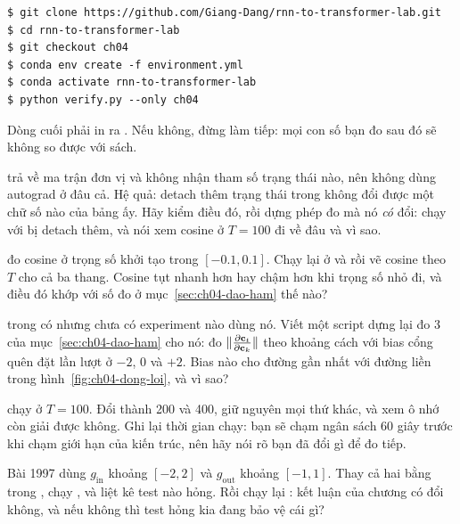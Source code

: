 \begin{verbatim}
$ git clone https://github.com/Giang-Dang/rnn-to-transformer-lab.git
$ cd rnn-to-transformer-lab
$ git checkout ch04
$ conda env create -f environment.yml
$ conda activate rnn-to-transformer-lab
$ python verify.py --only ch04
\end{verbatim}

Dòng cuối phải in ra . Nếu không, đừng làm tiếp: mọi con số
bạn đo sau đó sẽ không so được với sách.

\begin{bt}
  \item {} trả về ma trận đơn vị và không nhận
    tham số trạng thái nào, nên  không dùng autograd ở đâu
    cả. Hệ quả: detach thêm trạng thái  trong
     không đổi được một chữ số nào của bảng ấy. Hãy kiểm điều đó,
    rồi dựng phép đo mà nó \emph{có} đổi: chạy
     với  bị detach thêm, và nói
    xem cosine ở \(T = 100\) đi về đâu và vì sao.

  \item {} đo cosine ở trọng số khởi tạo
    trong \([-0.1, 0.1]\). Chạy lại ở  và 
    rồi vẽ cosine theo \(T\) cho cả ba thang. Cosine tụt nhanh hơn hay chậm hơn
    khi trọng số nhỏ đi, và điều đó khớp với số đo ở
    mục~\ref{sec:ch04-dao-ham} thế nào?

  \item {} trong  có 
    nhưng chưa có
    experiment nào dùng nó. Viết một script dựng lại đo 3 của
    mục~\ref{sec:ch04-dao-ham} cho nó: đo
    \(\lVert \frac{\partial \mathbf{c}_t}{\partial \mathbf{c}_k} \rVert\) theo khoảng cách với bias cổng quên
    đặt lần lượt ở \(-2\), \(0\) và \(+2\). Bias nào cho đường gần nhất với
    đường liền trong hình~\ref{fig:ch04-dong-loi}, và vì sao?

  \item {} chạy ở \(T = 100\). Đổi
     thành 200 và 400, giữ nguyên mọi thứ khác, và xem ô nhớ còn
    giải được không. Ghi lại thời gian chạy: bạn sẽ chạm ngân sách 60 giây
    trước khi chạm giới hạn của kiến trúc, nên hãy nói rõ bạn đã đổi gì để đo
    tiếp.

  \item Bài 1997 dùng \(g_{\mathrm{in}}\) khoảng \([-2,2]\) và
    \(g_{\mathrm{out}}\) khoảng \([-1,1]\). Thay cả hai bằng 
    trong , chạy ,
    và liệt kê test nào hỏng. Rồi chạy lại : kết luận của
    chương có đổi không, và nếu không thì test hỏng kia đang bảo vệ cái gì?
\end{bt}

